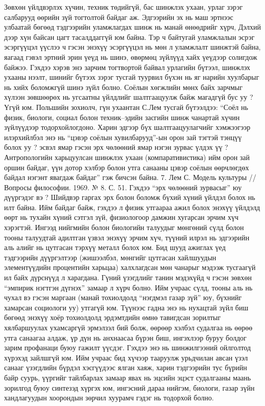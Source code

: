 Зөвхөн үйлдвэрлэх хүчин, техник төдийгүй, бас шинжлэх ухаан, урлаг зэрэг салбарууд өөрийн зүй тогтолтой байдаг аж. Эдгээрийн эх нь маш эртнээс улбаатай бөгөөд тэдгээрийн уламжлагдах шинж нь манай өнөөдрийг хүрч, Дэлхий дээр хүн байсан цагт тасалддаггүй юм байна.
Тэр ч байтугай уламжлалын эсрэг эсэргүүцэл үүслээ ч гэсэн энэхүү эсэргүүцэл нь мөн л уламжлалт шинжтэй байна, яагаад гэвэл эртний эрин үеүд нь шинэ, өвөрмөц зүйлүүд хайх үеүдээр солигдож байжээ. Гэхдээ хэрэв энэ зарчим тогтвортой байвал урлагийн бүтээл, шинжлэх ухааны нээлт, шинийг бүтээх зэрэг тусгай туурвил бүхэн нь яг нарийн хуулбарыг нь хийх боломжгүй шинэ зүйл болно. Соёлын хөгжлийн мөнх байх зарчмыг хүлээн зөвшөөрөх нь угсаатны үйлдлийг шалтгаацуулж байж магадгүй бус уу ? Үгүй юм.
Польшийн зохиолч, гүн ухаантан С.Лем тусгай бүтээлдээ: “Соёл нь физик, биологи, социал болон техник–эдийн засгийн шинж чанартай хүчин зүйлүүдээр тодорхойлогдоно. Харин эдгээр бүх шалтгаацуулагчийг хэмжээгээр илэрхийлбэл энэ нь “цэвэр соёлын хувилбарууд”-ын орон зай тэгтэй тэнцүү болох уу ? эсвэл ямар гэсэн эрх чөлөөний ямар нэгэн зурвас үлдэх үү ? Антропологийн харьцуулсан шинжлэх ухаан (компаративистика) ийм орон зай оршин байдаг, үүн дотор хэлбэр болон утга санааны цэвэр соёлын өөрчлөгдөх байдал нэгэнт явагдаж байдаг” гэж бичсэн байна. 7. Лем С. Модель культуры //Вопросы философии. 1969. № 8. С. 51.
Гэхдээ “эрх чөлөөний зурвасыг” юу дүүргэдэг вэ ? Шийдвэр гаргах эрх болон боломж бүхий хүний үйлдэл болох нь илт байна. Ийм байдаг байж, гэхдээ л физик утгаараа ажил болох энэхүү үйлдэлд өөрт нь тухайн хүний сэтгэл зүй, физиологоор дамжин хугарсан эрчим хүч хэрэгтэй. Ингээд нийгмийн болон биологийн талуудыг мөнгөний сүлд болон тооны талуудтай адилтган үзвэл энэхүү эрчим хүч, түүний илрэл нь эдгээрийн аль алийг нь цутгасан тэрхүү металл болох юм.
Бид шууд ажиглах үед тэдгээрийн дүүргэлтээр (жишээлбэл, мөнгийг цутгасан хайлшуудын элементүүдийн процентийн харьцаа) халхлагдсан мөн чанарыг мэдээж тусгаагүй ил байх дүрснүүд л харагдана. Гүний үзэгдлийг танин мэдэхүйд ч гэсэн зөвхөн “эмпирик нэгтгэн дүгнэх” замаар л хүрч болно. Ийм учраас сүлд, тооны аль нь чухал вэ гэсэн маргаан (манай тохиолдолд “нэгдмэл газар зүй” юу, бүхнийг хамарсан социологи уу) утгагүй юм. Түүнээс гадна энэ нь нухацтай зүйл биш бөгөөд энэхүү хоёр тохиолдолд эрдэмтдийн өмнө тавигдсан зорилтыг хялбаршуулах ухамсаргүй эрмэлзэл бий болж, өөрөөр хэлбэл судалгаа нь өөрөө утга санаагаа алдаж, үр дүн нь анхнаасаа бүрэн биш, ингэхлээр буруу болдог зарим профанаци буюу гажилт үүсдэг. Гэхдээ энэ нь шинжилгээний ойлголтод хүрэхэд зайлшгүй юм. Ийм учраас бид хүчээр тааруулж урьдчилан авсан үзэл санааг үзэгдлийн бүрдэл хэсгүүдээс ялган хаяж, харин тэдгээрийн тус бүрийн байр суурь, үүргийг тайлбарлах замаар явах нь эцсийн эцэст судалгааны маань зорилгод буюу синтезэд хүргэх юм, ингэсний дараа нийгэм, биологи, газар зүйн хандлагуудын хоорондын зөрчил хуурамч гэдэг нь тодорхой болно.
